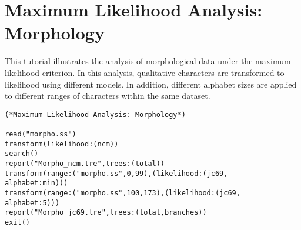 
\section{Maximum Likelihood Analysis: Morphology}{\label{tutorial 17}}
This tutorial illustrates the analysis of morphological data under the maximum likelihood 
criterion. In this analysis, qualitative characters are transformed to likelihood using different
models.  In addition, different alphabet sizes are applied to different ranges of characters 
within the same dataset.

\begin{verbatim}
(*Maximum Likelihood Analysis: Morphology*)

read("morpho.ss")
transform(likelihood:(ncm))
search()
report("Morpho_ncm.tre",trees:(total))
transform(range:("morpho.ss",0,99),(likelihood:(jc69,
alphabet:min)))
transform(range:("morpho.ss",100,173),(likelihood:(jc69,
alphabet:5)))
report("Morpho_jc69.tre",trees:(total,branches))
exit()
\end{verbatim}

